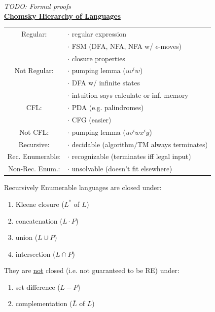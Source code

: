\documentclass[8pt,letterpaper,twocolumn]{article}
\begin{document}
\emph{TODO: Formal proofs}
\\
\underline{\textbf{Chomsky Hierarchy of Languages}} \\
\begin{tabular}{c l}
Regular: & $\cdot$ regular expression \\
& $\cdot$ FSM (DFA, NFA, NFA w/ $\epsilon$-moves) \\
& $\cdot$ closure properties \\
Not Regular: & $\cdot$ pumping lemma ($uv^iw$)\\
& $\cdot$ DFA w/ infinite states \\
& $\cdot$ intuition says calculate or inf. memory \\
\hline
CFL: & $\cdot$ PDA (e.g. palindromes) \\
& $\cdot$ CFG (easier) \\
Not CFL: & $\cdot$ pumping lemma ($uv^iwx^iy$) \\
\hline
Recursive: & $\cdot$ decidable (algorithm/TM always terminates) \\
Rec. Enumerable: & $\cdot$ recognizable (terminates iff legal input) \\
Non-Rec. Enum.: & $\cdot$ unsolvable (doesn't fit elsewhere) \\
\hline
\end{tabular}
Recursively Enumerable languages are closed under:
\begin{enumerate}
  \item Kleene closure ($L^*$ of $L$)
  \item concatenation ($L \cdot P$)
  \item union ($L \cup P$)
  \item intersection ($L \cap P$)
\end{enumerate}
They are \underline{not} closed (i.e. not guaranteed to be RE) under:
\begin{enumerate}
  \item set difference ($L - P$)
  \item complementation ($\bar{L}$ of $L$)
\end{enumerate}
\end{document}
